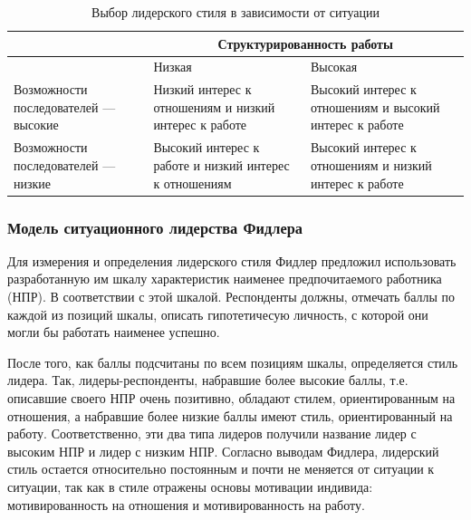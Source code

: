 \documentclass[a4paper,12pt,oneside,final]{extarticle}
\numberwithin{equation}{section}
\begin{document}
\begin{table}[h]
	\begin{tabularx}{\textwidth}{|X|X|X|}
		\hline
		& \multicolumn{2}{|c|}{Структурированность работы} \\ \hline
		& Низкая & Высокая \\ \hline 
		Возможности последователей --- высокие & Низкий интерес к отношениям и низкий интерес к работе & Высокий интерес к отношениям и высокий интерес к работе \\ \hline
		Возможности последователей --- низкие & Высокий интерес к работе и низкий интерес к отношениям & Высокий интерес к отношениям и низкий интерес к работе \\ \hline
	\end{tabularx}
	\caption{Выбор лидерского стиля в зависимости от ситуации}
	\label{tab:leadership_sj}
\end{table}

\subsubsection{Модель ситуационного лидерства Фидлера}
Для измерения и определения лидерского стиля Фидлер предложил использовать разработанную им шкалу характеристик наименее предпочитаемого работника (НПР). 
В соответствии с этой шкалой. 
Респонденты должны, отмечать баллы по каждой из позиций шкалы, описать гипотетичесую личность, с которой они могли бы работать наименее успешно.

После того, как баллы подсчитаны по всем позициям шкалы, определяется стиль лидера.
Так, лидеры-респонденты, набравшие более высокие баллы, т.е. описавшие своего НПР очень позитивно, обладают стилем, ориентированным на отношения, а набравшие более низкие баллы имеют стиль, ориентированный на работу. 
Соответственно, эти два типа лидеров получили название лидер с высоким НПР и лидер с низким НПР. 
Согласно выводам Фидлера, лидерский стиль остается относительно постоянным и почти не меняется от ситуации к ситуации, так как в стиле отражены основы мотивации индивида: мотивированность на отношения и мотивированность на работу.
\end{document}
